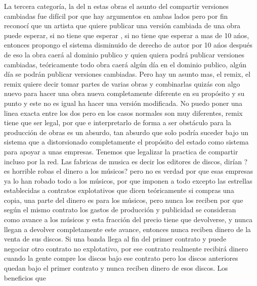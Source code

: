 \begin{multicols}{2}
La tercera categoría, la del {\em {\color{introcolor}{ arte y entretenimiento, }}}n estas obras el asunto del compartir versiones cambiadas fue difícil por que hay argumentos en ambas lados pero por fin reconocí que un artista que quiere publicar una versión cambiada de una obra puede esperar, si no tiene que esperar , si no tiene que esperar a mas de 10 ańos, entonces propongo el sistema disminuido de derecho de autor por 10 ańos después de eso la obra caerá al dominio publico y quien quiera podrá publicar versiones cambiadas, teóricamente todo obra caerá algún día en el dominio publico, algún día se podrán publicar versiones cambiadas.  Pero hay un asunto mas, el remix, el remix quiere decir tomar partes de varias obras y combinarlas quizás con algo nuevo para hacer una obra nueva completamente diferente en su propósito y su punto y este no es igual ha hacer una versión modificada. No puedo poner una linea exacta entre los dos pero en los casos normales son muy diferentes, remix tiene que ser legal, por que {\em {\color{introcolor}{ el propósito del derecho de autor es fomentar la producción de obras }}} e interpretarlo de forma a ser obstáculo para la producción de obras es un absurdo, tan absurdo que solo podría suceder bajo un sistema que a distorsionado completamente el propósito del estado como sistema para apoyar a unas empresas. Tenemos que legalizar la practica de compartir incluso por la red. Las fabricas de musica es decir los editores de discos, dirían ?es horrible robas el dinero a los músicos? pero no es verdad por que esas empresas ya lo han robado todo a los músicos, por que imponen a todo excepto las estrellas establecidas a contratos explotativos que dicen teóricamente si compras una copia, una parte del dinero es para los músicos, pero nunca los reciben por que según el mismo contrato los gastos de producción y publicidad se consideran como avance a los músicos y esta fracción del precio tiene que devolverse, y nunca llegan a devolver completamente este avance, entonces nunca reciben dinero de la venta de sus discos.  Si una banda llega al fin del primer contrato y puede negociar otro contrato no explotativo, por ese contrato realmente recibirá dinero cuando la gente compre los discos bajo ese contrato pero los discos anteriores quedan bajo el primer contrato y nunca reciben dinero de esos discos. Los beneficios que 



\end{multicols}
